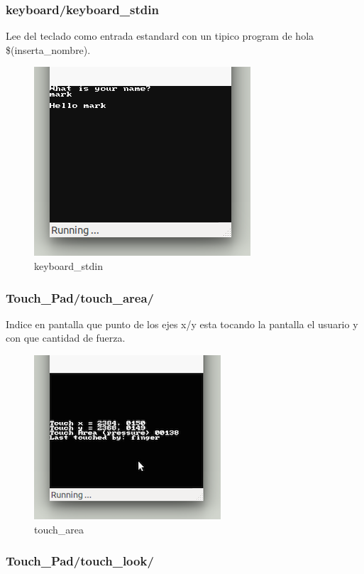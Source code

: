 \subsubsection{keyboard/keyboard\_stdin}

Lee del teclado como entrada estandard con un tipico program de hola \$(inserta\_nombre).

\begin{figure}[H] 
\centering
\includegraphics[scale=0.75]{P2Media/keyboard_stdin.png}
\caption{keyboard\_stdin}
\end{figure}

\subsubsection{Touch\_Pad/touch\_area/}

Indice en pantalla que punto de los ejes x/y esta tocando la pantalla el usuario y con que cantidad de fuerza.

\begin{figure}[H] 
\centering
\includegraphics[scale=0.75]{P2Media/touch_area.png}
\caption{touch\_area}
\end{figure}

\subsubsection{Touch\_Pad/touch\_look/}


